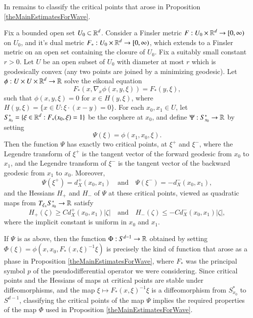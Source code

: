 In remains to classify the critical points that arose in Proposition \ref{theMainEstimatesForWave}.

\begin{prop} \label{triangleLemma}
    Fix a bounded open set $U_0 \subset \operatorname{\mathbb{R}}^d$. Consider a Finsler metric $F: U_0 \times \operatorname{\mathbb{R}}^d \to [0,\infty)$ on $U_0$, and it's dual metric $F_*: U_0 \times \operatorname{\mathbb{R}}^d \to [0,\infty)$, which extends to a Finsler metric on an open set containing the closure of $U_0$. Fix a suitably small constant $r > 0$. Let $U$ be an open subset of $U_0$ with diameter at most $r$ which is geodesically convex (any two points are joined by a minimizing geodesic). Let $\phi: U \times U \times \operatorname{\mathbb{R}}^d \to \operatorname{\mathbb{R}}$ solve the eikonal equation
    \[ F_* ( x, \nabla_x \phi(x,y,\xi) ) = F_*(y,\xi), \]
    such that $\phi(x,y,\xi) = 0$ for $x \in H(y,\xi)$, where $H(y, \xi) = \{ x \in U : \xi \cdot (x - y) = 0 \}$. For each $x_0,x_1 \in U$, let $S_{x_0}^* = \{ \xi \in \operatorname{\mathbb{R}}^d: F_*(x_0,\xi) = 1 \}$ be the cosphere at $x_0$, and define $\Psi: S_{x_0}^* \to \operatorname{\mathbb{R}}$ by setting
    \[ \Psi(\xi) = \phi(x_1,x_0,\xi). \]
    Then the function $\Psi$ has exactly two critical points, at $\xi^+$ and $\xi^-$, where the Legendre transform of $\xi^+$ is the tangent vector of the forward geodesic from $x_0$ to $x_1$, and the Legendre transform of $\xi^-$ is the tangent vector of the backward geodesic from $x_1$ to $x_0$. Moreover,
    \[ \Psi(\xi^+) = d_X^+(x_0,x_1) \quad\text{and}\quad \Psi(\xi^-) = - d_X^-(x_0,x_1), \]
    and the Hessians $H_+$ and $H_-$ of $\Psi$ at these critical points, viewed as quadratic maps from $T_{\xi_{\pm}} S_{x_0}^* \to \operatorname{\mathbb{R}}$ satisfy
    \[ H_+(\zeta) \geq C d_X^+(x_0,x_1) |\zeta| \quad\text{and}\quad H_-(\zeta) \leq - C d_X^-(x_0,x_1) |\zeta|, \]
    where the implicit constant is uniform in $x_0$ and $x_1$.
\end{prop}

If $\Psi$ is as above, then the function $\Phi: S^{d-1} \to \operatorname{\mathbb{R}}$ obtained by setting $\Phi(\xi) = \phi( x, x_0, F_*(x,\xi)^{-1} \xi  )$ is precisely the kind of function that arose as a phase in Proposition \ref{theMainEstimatesForWave}, where $F_*$ was the principal symbol $p$ of the pseudodifferential operator we were considering. Since critical points and the Hessians of maps at critical points are stable under diffeomorphisms, %
and the map $\xi \mapsto F_*(x,\xi)^{-1} \xi$ is a diffeomorphism from $S_{x_0}^*$ to $S^{d-1}$, classifying the critical points of the map $\Psi$ implies the required properties of the map $\Phi$ used in Proposition \ref{theMainEstimatesForWave}.

